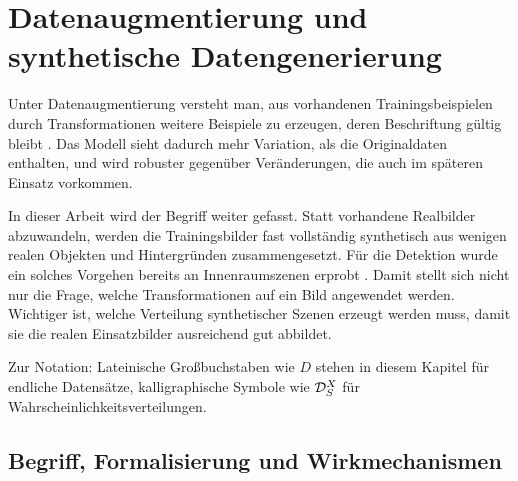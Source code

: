 %
%




%

\chapter{Datenaugmentierung und synthetische Datengenerierung}
\label{kap:augtheorie}

Unter Datenaugmentierung versteht man, aus vorhandenen Trainingsbeispielen
durch Transformationen weitere Beispiele zu erzeugen, deren Beschriftung gültig
bleibt \parencite{shorten2019}. Das Modell sieht dadurch mehr Variation, als die
Originaldaten enthalten, und wird robuster gegenüber Veränderungen, die auch im
späteren Einsatz vorkommen.

In dieser Arbeit wird der Begriff weiter gefasst. Statt vorhandene Realbilder
abzuwandeln, werden die Trainingsbilder fast vollständig synthetisch aus wenigen
realen Objekten und Hintergründen zusammengesetzt. Für die Detektion wurde ein
solches Vorgehen bereits an Innenraumszenen erprobt \parencite{georgakis2017}.
Damit stellt sich nicht nur die Frage, welche Transformationen auf ein Bild
angewendet werden. Wichtiger ist, welche Verteilung synthetischer Szenen erzeugt
werden muss, damit sie die realen Einsatzbilder ausreichend gut abbildet.

Zur Notation: Lateinische Großbuchstaben wie $D$ stehen in diesem Kapitel für
endliche Datensätze, kalligraphische Symbole wie $\mathcal{D}_{S}^{X}$ für
Wahrscheinlichkeitsverteilungen.

\section{Begriff, Formalisierung und Wirkmechanismen}
\label{sec:aug-formalisierung}

